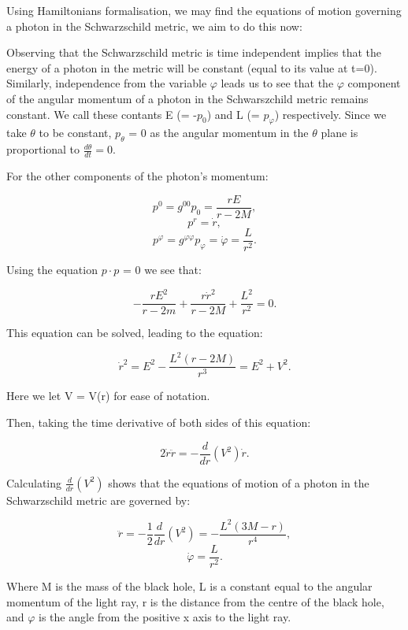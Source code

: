 \documentclass[oneside,openright,frontopenright, singlespacing]{dmathesis}
\begin{document}
	Using Hamiltonians formalisation, we may find the equations of motion governing a photon in the Schwarzschild metric, we aim to do this now:

	Observing that the Schwarzschild metric is time independent implies that the energy of a photon in the metric will be constant (equal to its value at t=0). Similarly, independence from the variable $\varphi$ leads us to see that the $\varphi$ component of the angular momentum of a photon in the Schwarszchild metric remains constant. We call these contants E (= -$p_0$) and L (= $p_\varphi$) respectively. Since we take ${\theta}$ to be constant, $p_\theta$ = 0 as the angular momentum in the $\theta$ plane is proportional to $\frac{d\theta}{dt} = 0$.

\vspace{1em}
	For the other components of the photon's momentum:

	\[p^0 = g^{00}p_0 = \frac{rE}{r-2M},\]
	\[p^r = \dot{r},\]
	\[p^\varphi = g^{\varphi\varphi}p_\varphi = \dot{\varphi} = \frac{L}{r^2}.\]

\vspace{1em}
	Using the equation $p \cdot p$ = 0 we see that:

	\[-\frac{rE^2}{r-2m}+\frac{r\dot{r}^2}{r-2M}+\frac{L^2}{r^2}=0.\]

\vspace{1em}
	This equation can be solved, leading to the equation:

	\[\dot{r}^2 = E^2-\frac{L^2(r-2M)}{r^3} = E^2 + V^2.\]

\vspace{1em}
	Here we let V = V(r) for ease of notation.

\vspace{1em}
	Then, taking the time derivative of both sides of this equation:

	\[2\dot{r}\ddot{r} = -\frac{d}{dr}(V^2)\dot{r}.\]

\vspace{1em}
	Calculating $\frac{d}{dr}(V^2)$ shows that the equations of motion of a photon in the Schwarzschild metric are governed by:

	\[\ddot{r} = -\frac{1}{2}\frac{d}{dr}(V^2) = -\frac{L^2(3M-r)}{r^4},\]
	\[\dot{\varphi}=\frac{L}{r^2}.\]

\vspace{1em}
	Where M is the mass of the black hole, L is a constant equal to the angular momentum of the light ray, r is the distance from the centre of the black hole, and $\varphi$ is the angle from the positive x axis to the light ray.
\end{document}

